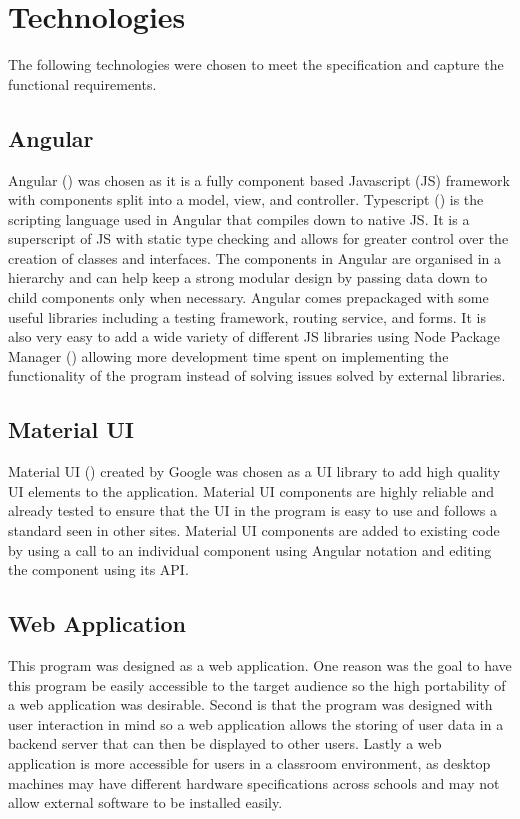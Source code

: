 \documentclass{l4proj}
\begin{document}
\section{Technologies}
The following technologies were chosen to meet the specification and capture the functional requirements.

\subsection{Angular}
Angular (\cite{noauthor_angular_nodate-1}) was chosen as it is a fully component based Javascript (JS) framework with components split into a model, view, and controller. Typescript (\cite{noauthor_typed_nodate}) is the scripting language used in Angular that compiles down to native JS. It is a superscript of JS with static type checking and allows for greater control over the creation of classes and interfaces. The components in Angular are organised in a hierarchy and can help keep a strong modular design by passing data down to child components only when necessary. Angular comes prepackaged with some useful libraries including a testing framework, routing service, and forms. It is also very easy to add a wide variety of different JS libraries using Node Package Manager (\cite{noauthor_npm_nodate}) allowing more development time spent on implementing the functionality of the program instead of solving issues solved by external libraries.

\subsection{Material UI}
Material UI (\cite{material}) created by Google was chosen as a UI library to add high quality UI elements to the application. Material UI components are highly reliable and already tested to ensure that the UI in the program is easy to use and follows a standard seen in other sites. Material UI components are added to existing code by using a call to an individual component using Angular notation and editing the component using its API.

\subsection{Web Application}
This program was designed as a web application. One reason was the goal to have this program be easily accessible to the target audience so the high portability of a web application was desirable. Second is that the program was designed with user interaction in mind so a web application allows the storing of user data in a backend server that can then be displayed to other users. Lastly a web application is more accessible for users in a classroom environment, as desktop machines may have different hardware specifications across schools and may not allow external software to be installed easily.
\end{document}
